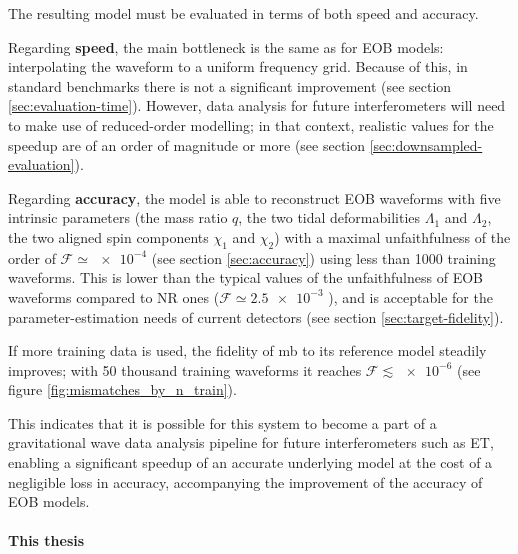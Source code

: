 \documentclass[main.tex]{subfiles}
\begin{document}
The resulting model must be evaluated in terms of both speed and accuracy.

Regarding \textbf{speed}, the main bottleneck is the same as for \ac{EOB} models: interpolating the waveform to a uniform frequency grid. 
Because of this, in standard benchmarks there is not a significant improvement (see section \ref{sec:evaluation-time}). 
However, data analysis for future interferometers will need to make use of reduced-order modelling; in that context, realistic values for the  speedup are of an order of magnitude or more (see section \ref{sec:downsampled-evaluation}). 

Regarding \textbf{accuracy}, the model is able to reconstruct \ac{EOB} waveforms with five intrinsic parameters (the mass ratio \(q\), the two tidal deformabilities \(\Lambda_1\) and \(\Lambda_2 \), the two aligned spin components \(\chi_1 \) and \(\chi_2 \)) with a maximal unfaithfulness of the order of \(\mathcal{F} \simeq \num{e-4}\) (see section \ref{sec:accuracy}) using less than 1000 training waveforms.
This is lower than the typical values of the unfaithfulness of EOB waveforms compared to \ac{NR} ones (\(\mathcal{F} \simeq \num{2.5e-3}\) \cite{nagarTimedomainEffectiveonebodyGravitational2018}), and is acceptable for the parameter-estimation needs of current detectors (see section \ref{sec:target-fidelity}).

If more training data is used, the fidelity of \ac{mb} to its reference model steadily improves; with 50 thousand training waveforms it reaches \(\mathcal{F} \lesssim \num{e-6}\) (see figure \ref{fig:mismatches_by_n_train}). 

This indicates that it is possible for this system to become a part of a gravitational wave data analysis pipeline for future interferometers such as \ac{ET}, enabling a significant speedup of an accurate underlying model at the cost of a negligible loss in accuracy, accompanying the improvement of the accuracy of \ac{EOB} models.


\paragraph{This thesis}
\end{document}
